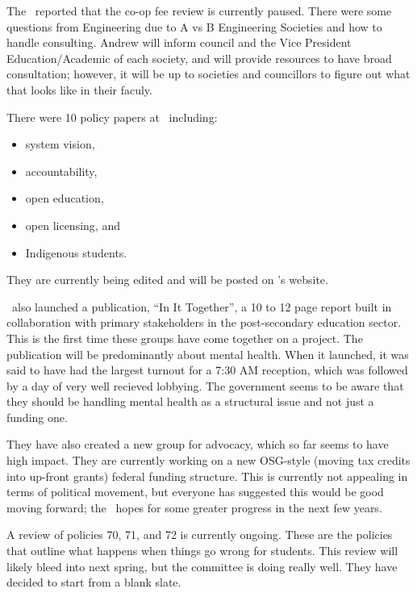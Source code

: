 \begin{information}

    The \vpe\ reported that the co-op fee review is currently paused. There
    were some questions from Engineering due to A vs B Engineering Societies and 
    how to handle consulting. Andrew will inform council and the Vice President
    Education/Academic of each society, and will provide resources to have
    broad consultation; however, it will be up to societies and councillors to
    figure out what that looks like in their faculy. 

    There were 10 policy papers at \ousa\ including: 
    \begin{itemize}
        \item system vision, 
        \item accountability,
        \item open education,
        \item open licensing, and
        \item Indigenous students.
    \end{itemize} They are currently being edited and will be posted on \ousa's
    website. 

    \ousa\ also launched a publication, ``In It Together'', a 10 to 12 page 
    report built in collaboration with primary stakeholders in the 
    post-secondary education sector. This is the first time these
    groups have come together on a project. The publication will be
    predominantly about mental health. When it launched, it was said to have
    had the largest turnout for a 7:30 AM reception, which was followed by  a 
    day of very well recieved lobbying. The government seems to be aware that 
    they should be handling mental health as a structural issue and not just a
    funding one.

    They have also created a new group for advocacy, which so far seems to have
    high impact. They are currently working on a new OSG-style (moving tax
    credits into up-front grants) federal funding structure. This is currently
    not appealing in terms of political movement, but everyone has suggested 
    this would be good moving forward; the \vped\ hopes for some greater 
    progress in the next few years. 

    A review of policies 70, 71, and 72 is currently ongoing. These are the 
    policies that outline what happens when things go wrong for students.
    This review will likely bleed into next spring, but the committee is doing
    really well. They have decided to start from a blank slate. 


\end{information}
